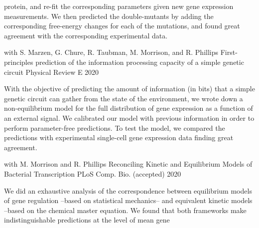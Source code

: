 \begin{cventries}
{\begin{cvitems}
{\begin{flushleft}
            protein, and re-fit the corresponding parameters given new gene
            expression measurements. We then predicted the double-mutants by
            adding the corresponding free-energy changes for each of the
            mutations, and found great agreement with the corresponding
            experimental data.
          \end{flushleft}
            }
          \end{cvitems}
        }
        \cventry
        {with S. Marzen, G. Chure, R. Taubman, M. Morrison, and R. Phillips} %
        {First-principles prediction of the information processing capacity of a simple genetic circuit} %
        {Physical Review E} %
        {2020} %
        {
          \begin{cvitems} %
            \item {
            \begin{flushleft}
              With the objective of predicting the amount of information (in
              bits) that a simple genetic circuit can gather from the state of
              the environment, we wrote down a non-equilibrium model for the
              full distribution of gene expression as a function of an external
              signal. We calibrated our model with previous information in order
              to perform parameter-free predictions. To test the model, we
              compared the predictions with experimental single-cell gene
              expression data finding great agreement.
          \end{flushleft}
            }
          \end{cvitems}
        }
      \cventry
        {with M. Morrison and R. Phillips} %
        {Reconciling Kinetic and Equilibrium Models of Bacterial Transcription} %
        {PLoS Comp. Bio. (accepted)} %
        {2020} %
        {
          \begin{cvitems} %
            \item {
            \begin{flushleft}
              We did an exhaustive analysis of the correspondence between
              equilibrium models of gene regulation --based on statistical
              mechanics-- and equivalent kinetic models --based on the chemical
              master equation. We found that both frameworks make
              indistinguishable predictions at the level of mean gene

\end{flushleft}}
\end{cvitems}}
\end{cventries}
